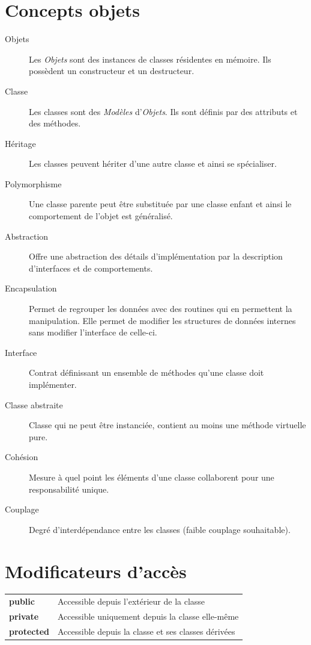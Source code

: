 \documentclass{article}
\begin{document}
\begin{multicols*}{3}
\section*{Concepts objets}
\begin{description}
\item[Objets] Les \emph{Objets} sont des instances de classes résidentes en mémoire. Ils possèdent un constructeur et un destructeur.
\item[Classe] Les classes sont des \emph{Modèles} d'\emph{Objets}. Ils sont définis par des attributs et des méthodes. 
\item[Héritage] Les classes peuvent hériter d'une autre classe et ainsi se spécialiser.
\item[Polymorphisme] Une classe parente peut être substituée par une classe enfant et ainsi le comportement de l'objet est généralisé.
\item[Abstraction] Offre une abstraction des détails d'implémentation par la description d'interfaces et de comportements. 
\item[Encapsulation] Permet de regrouper les données avec des routines qui en permettent la manipulation. Elle permet de modifier les structures de données internes sans modifier l'interface de celle-ci.
\item[Interface] Contrat définissant un ensemble de méthodes qu'une classe doit implémenter.
\item[Classe abstraite] Classe qui ne peut être instanciée, contient au moins une méthode virtuelle pure.
\item[Cohésion] Mesure à quel point les éléments d'une classe collaborent pour une responsabilité unique.
\item[Couplage] Degré d'interdépendance entre les classes (faible couplage souhaitable).
\end{description}

\section*{Modificateurs d'accès}
\begin{tabularx}{\columnwidth}{lX}
\textbf{public} & Accessible depuis l'extérieur de la classe \\
\textbf{private} & Accessible uniquement depuis la classe elle-même \\
\textbf{protected} & Accessible depuis la classe et ses classes dérivées \\
\end{tabularx}


\end{multicols*}
\end{document}
